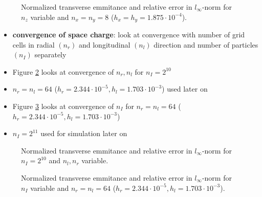 \begin{center}
\begin{figure}[H]
   \begin{subfigure}{0.4\textwidth}
      
   \end{subfigure}
   \qquad \qquad \qquad
   \begin{subfigure}{0.4\textwidth}
      
   \end{subfigure}
   \caption{Normalized transverse emmitance and relative error in $l_\infty$-norm for $n_z$ variable and $n_x=n_y=8$ ($h_x=h_y=1.875 \cdot 10^{-4}$).}
   \label{fig:map_cvg_z}
\end{figure}
\end{center}

\begin{itemize}
   \item \textbf{convergence of space charge}: look at convergence with number of grid cells in radial $(n_r)$ and longitudinal $(n_l)$ direction and number of particles $(n_I)$ separately

   \item Figure \ref{fig:sc_cvg_rl} looks at convergence of $n_r, n_l$ for $n_I=2^{10}$
   \item $n_r=n_l=64$ ($h_r=2.344 \cdot 10^{-5}, h_l=1.703 \cdot 10^{-3}$) used later on

   \item Figure \ref{fig:sc_cvg_I} looks at convergence of $n_I$ for $n_r=n_l=64$ ($h_r=2.344 \cdot 10^{-5}, h_l=1.703 \cdot 10^{-3}$)
   \item $n_I=2^{11}$ used for simulation later on
\end{itemize}

\begin{center}
\begin{figure}[H]
   \begin{subfigure}{0.4\textwidth}
      
   \end{subfigure}
   \qquad \qquad \qquad
   \begin{subfigure}{0.4\textwidth}
      
   \end{subfigure}
   \caption{Normalized transverse emmitance and relative error in $l_\infty$-norm for $n_I=2^{10}$ and $n_l, n_r$ variable.}
   \label{fig:sc_cvg_rl}
\end{figure}
\end{center}

\begin{center}
\begin{figure}[H]
   \begin{subfigure}{0.4\textwidth}
      
   \end{subfigure}
   \qquad \qquad \qquad
   \begin{subfigure}{0.4\textwidth}
      
   \end{subfigure}
   \caption{Normalized transverse emmitance and relative error in $l_\infty$-norm for $n_I$ variable and $n_r=n_l=64$ ($h_r=2.344 \cdot 10^{-5}, h_l=1.703 \cdot 10^{-3}$).}
   \label{fig:sc_cvg_I}
\end{figure}
\end{center}

